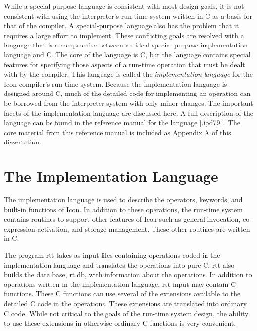 While a special-purpose language is consistent with most design goals,
it is not consistent with using the interpreter's run-time system
written in C as a basis for that of the compiler. A special-purpose
language also has the problem that it requires a large effort to
implement. These conflicting goals are resolved with a language that
is a compromise between an ideal special-purpose implementation
language and C. The core of the language is C, but the language
contains special features for specifying those aspects of a run-time
operation that must be dealt with by the compiler.  This language is
called the \textit{implementation language} for the Icon compiler's
run-time system. Because the implementation language is designed
around C, much of the detailed code for implementing an operation can
be borrowed from the interpreter system with only minor changes. The
important facets of the implementation language are discussed here. A
full description of the language can be found in the reference manual
for the language [.ipd79.]. The core material from this reference
manual is included as Appendix A of this dissertation.


\section{The Implementation Language }

The implementation language is used to describe the operators,
keywords, and built-in functions of Icon. In addition to these
operations, the run-time system contains routines to support other
features of Icon such as general invocation, co-expression activation,
and storage management. These other routines are written in C.

The program rtt takes as input files containing operations coded in
the implementation language and translates the operations into pure
C. rtt also builds the data base, rt.db, with information about the
operations. In addition to operations written in the implementation
language, rtt input may contain C functions. These C functions can use
several of the extensions available to the detailed C code in the
operations. These extensions are translated into ordinary C
code. While not critical to the goals of the run-time system design,
the ability to use these extensions in otherwise ordinary C functions
is very convenient.

